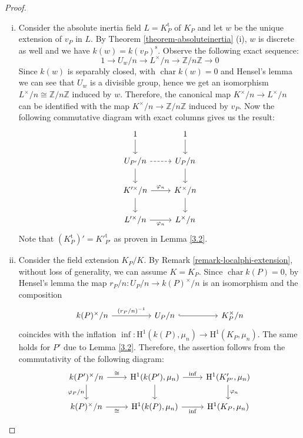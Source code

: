 \begin{proof}
\begin{enumerate}[(i)]
\item Consider the absolute inertia field $L = K_P^\text{t}$ of $K_P$ and let $w$ be the unique extension of $v_P$ in $L$. By Theorem \ref{theorem-absoluteinertia} (i), $w$ is discrete as well and we have $k(w) = k(v_P)^\text{s}$. Observe the following exact sequence:
\[ 1 \longrightarrow U_w/n \longrightarrow L^\times /n\longrightarrow \mathbb{Z}/n\mathbb{Z}\longrightarrow 0 \]
Since $k(w)$ is separably closed, with $\operatorname{char} k(w)=0$ and Hensel's lemma we can see that $U_w$ is a divisible group, hence we get an isomorphism $L^\times /n\cong \mathbb{Z}/n\mathbb{Z}$ induced by $w$. Therefore, the canonical map $K^\times/n\to L^\times/n$ can be identified with the map $K^\times/n \to\mathbb{Z}/n\mathbb{Z}$ induced by $v_P$. Now the following commutative diagram with exact columns gives us the result:
\[ \begin{tikzcd}
1 \ar[d] & 1 \ar[d]\\
U_{P'}/n \ar[r, dashed]\ar[d] & U_P/n\ar[d]\\
K'^\times /n \ar[r, "\varphi_n"]\ar[d] & K^\times/n\ar[d]\\
L'^\times /n \ar[r, "\varphi_n"'] &  L^\times /n
\end{tikzcd}\]
Note that $(K^\text{t}_P)' = K'^{\text{t}}_{P'}$ as proven in Lemma \ref{3.2}.
\item Consider the field extension $K_P/K$. By Remark \ref{remark-localphi-extension}, without loss of generality, we can assume $K=K_P$. Since $\operatorname{char}k(P)=0$, by Hensel's lemma the map $r_P/n: U_P/n\to k(P)^\times/n$ is an isomorphism and the composition
\[\begin{tikzcd}
k(P)^\times / n\ar[rr, "(r_P/n)^{-1}"] && U_P/n \ar[rr, hook] && K_P^\times/n
\end{tikzcd}\]
coincides with the inflation $\operatorname{inf}: \mathrm{H}^1(k(P), \mu_n) \to \mathrm{H}^1(K_P,\mu_n)$. The same holds for $P'$ due to Lemma \ref{3.2}. Therefore, the assertion follows from the commutativity of the following diagram:
\[ \begin{tikzcd}
k(P')^\times/n \ar[r, "\cong"] \ar[d, "\varphi_P/n"'] & \mathrm{H}^1(k(P'),\mu_n) \ar[r, "\mathrm{inf}"] \ar[d]& \mathrm{H}^1(K'_{P'}, \mu_n) \ar[d, "\varphi_n"] \\
k(P)^\times/n \ar[r, "\cong"'] & \mathrm{H}^1(k(P),\mu_n)  \ar[r, "\mathrm{inf}"'] & \mathrm{H}^1(K_{P}, \mu_n)
\end{tikzcd}  \qedhere\]
\end{enumerate}
\end{proof}

